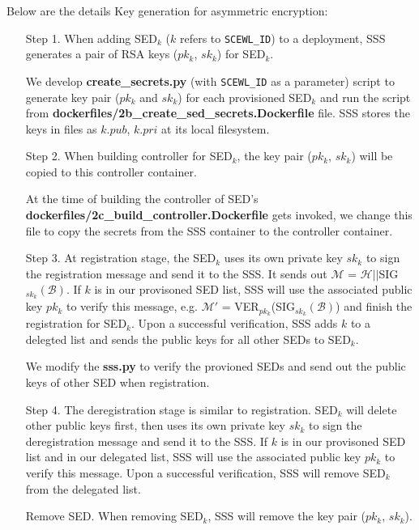 \documentclass[11pt,oneside,onecolumn,letterpaper]{article}
\begin{document}
Below are the details Key generation for asymmetric encryption:
\begin{itemize}
  \item[Step 1.] When adding SED$_k$ ($k$ refers to \verb|SCEWL_ID|) to a deployment, SSS generates a pair of RSA keys ($pk_k$, $sk_k$) for SED$_k$.
  
  We develop \textbf{create\_secrets.py} (with \verb|SCEWL_ID| as a parameter) script to generate key pair ($pk_k$ and $sk_k$) for each provisioned SED$_k$ and run the script from  \textbf{dockerfiles/2b\_create\_sed\_secrets.Dockerfile} file.
  SSS stores the keys in files as $k.pub$, $k.pri$ at its local filesystem.

  \item[Step 2.] When building controller for SED$_k$, the key pair ($pk_k$, $sk_k$) will be copied to this controller container.
  
  At the time of building the controller of SED's \textbf{dockerfiles/2c\_build\_controller.Dockerfile}  gets invoked, we change this file to copy the secrets from the SSS container to the controller container.

  \item[Step 3.] At registration stage, the SED$_k$ uses its own private key $sk_k$ to sign the registration message and send it to the SSS.
  It sends out $\mathcal{M}$ = $\mathcal{H} || $SIG$_{sk_k}(\mathcal{B})$.
  If $k$ is in our provisoned SED list, SSS will use the associated public key $pk_k$ to verify this message, e.g. $\mathcal{M'}$ = VER$_{pk_k}$(SIG$_{sk_k}(\mathcal{B})$) and finish the registration for SED$_k$.
  Upon a successful verification, SSS adds $k$ to a delegted list and sends the public keys for all other SEDs to SED$_k$.
  
  We modify the \textbf{sss.py} to verify the provioned SEDs and send out the public keys of other SED when registration.

  \item[Step 4.] The deregistration stage is similar to registration.
  SED$_k$ will delete other public keys first, then uses its own private key $sk_k$ to sign the deregistration message and send it to the SSS.
  If $k$ is in our provisoned SED list and in our delegated list, SSS will use the associated public key $pk_k$ to verify this message.
  Upon a successful verification, SSS will remove SED$_k$ from the delegated list.

  \item[Remove SED.] When removing SED$_k$, SSS will remove the key pair ($pk_k$, $sk_k$).
\end{itemize}
\end{document}

